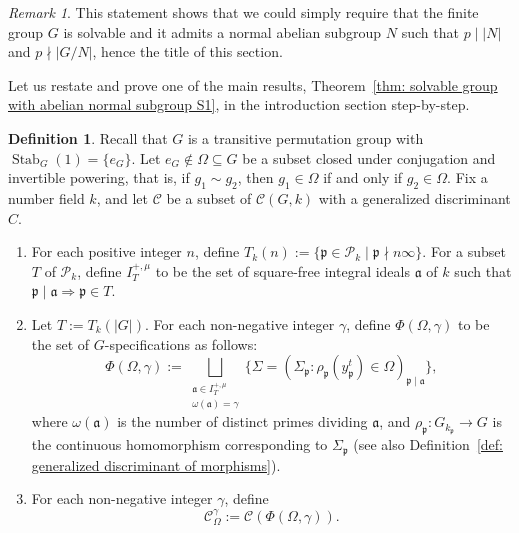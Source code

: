 \documentclass[12pt,a4paper]{amsart}
\numberwithin{equation}{section}%
\theoremstyle{plain}%
\theoremstyle{definition}%
\newtheorem{definition}[theorem]{Definition}%
\theoremstyle{remark}%
\newtheorem*{remark}{Remark}%
\begin{document}
    \begin{remark}
    	This statement shows that we could simply require that the finite group $G$ is solvable and it admits a normal abelian subgroup $N$ such that $p\mid\lvert N\rvert$ and $p\nmid\lvert G/N\rvert$, hence the title of this section.
    \end{remark}
    Let us restate and prove one of the main results, Theorem~\ref{thm: solvable group with abelian normal subgroup S1}, in the introduction section step-by-step.
    \begin{definition}\label{def: the set of G-specifications Phi}
    	Recall that $G$ is a transitive permutation group with $\operatorname{Stab}_{G}(1)=\{e_{G}\}$.
    	Let $e_{G}\notin\Omega\subseteq G$ be a subset closed under conjugation and invertible powering, that is, if $g_{1}\sim g_{2}$, then $g_{1}\in\Omega$ if and only if $g_{2}\in\Omega$.
    	Fix a number field $k$, and let $\mathcal{C}$ be a subset of $\mathcal{C}(G,k)$ with a generalized discriminant $C$.
    	\begin{enumerate}
    		\item For each positive integer $n$, define $T_{k}(n):=\{\mathfrak{p}\in\mathcal{P}_{k}\mid\mathfrak{p}\nmid n\infty\}$.
    		For a subset $T$ of $\mathcal{P}_{k}$, define $I_{T}^{+,\mu}$ to be the set of square-free integral ideals $\mathfrak{a}$ of $k$ such that $\mathfrak{p}\mid\mathfrak{a}\Rightarrow\mathfrak{p}\in T$.
    		\item Let $T:=T_{k}(\lvert G\rvert)$.
    		For each non-negative integer $\gamma$, define $\Phi(\Omega,\gamma)$ to be the set of $G$-specifications as follows:
    		\begin{equation*}
    			\Phi(\Omega,\gamma):=
    			\bigsqcup_{
    				\substack{
    					\mathfrak{a}\in I_{T}^{+,\mu} \\
    					\omega(\mathfrak{a})=\gamma
    				}
    			}\{\Sigma=(\Sigma_{\mathfrak{p}}:\rho_{\mathfrak{p}}(y_{\mathfrak{p}}^{t})\in\Omega)_{\mathfrak{p}\mid\mathfrak{a}}\},
    		\end{equation*}
    		where $\omega(\mathfrak{a})$ is the number of distinct primes dividing $\mathfrak{a}$, and $\rho_{\mathfrak{p}}:G_{k_{\mathfrak{p}}}\to G$ is the continuous homomorphism corresponding to $\Sigma_{\mathfrak{p}}$ (see also Definition~\ref{def: generalized discriminant of morphisms}).
    		\item For each non-negative integer $\gamma$, define
    		\begin{equation*}
    			\mathcal{C}_{\Omega}^{\gamma}:=\mathcal{C}(\Phi(\Omega,\gamma)).
    		\end{equation*}
    	\end{enumerate}		
    \end{definition}
\end{document}

